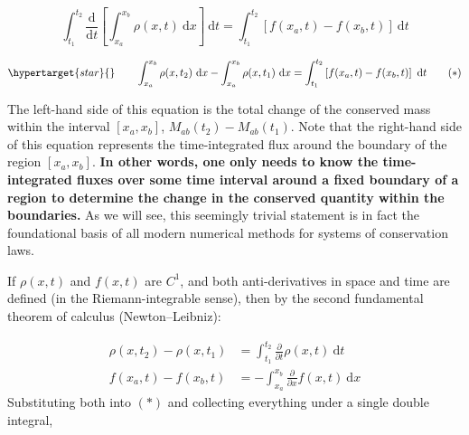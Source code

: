 \documentclass[notoc]{tufte-handout}
\begin{document}
\begin{equation}
\int_{t_1}^{t_2} \frac{\mathrm{d}}{\mathrm{d}t } \left[ \int_{x_a}^{x_b} \rho ({x},t)~\mathrm{d}x \right] ~\mathrm{d}t  = \int_{t_1}^{t_2} \left[ f(x_a,t) - f(x_b,t) \right]~\mathrm{d}t
\end {equation}

\begin {equation}
\hypertarget{star}{}\qquad \int_{x_a}^{x_b} \rho (x,t_2)~\mathrm{d}x - \int_{x_a}^{x_b} \rho (x,t_1)~\mathrm{d}x  =  \int_{t_1}^{t_2} \left[ f(x_a,t) - f(x_b,t) \right]~\mathrm{d}t \qquad (*)
\label{eqn:integral_form}
\end {equation}


The left-hand side of this equation is the total change of the conserved mass within the interval  $[x_a,x_b]$, $M_{ab}(t_2) - M_{ab}(t_1)$. Note that the right-hand side of this equation represents the time-integrated flux around the boundary of the region  $[x_a,x_b]$. {\bf In other words,  one only needs to know the time-integrated fluxes over some time interval around a fixed boundary of a region to determine the change in the conserved quantity within the boundaries.}  As we will see, this seemingly trivial statement is in fact the foundational basis of all modern numerical methods for systems of conservation laws.

If $\rho (x, t)$ and $f (x, t)$ are $C^1$, and both anti-derivatives in space and time are defined (in the Riemann-integrable sense), then by the second fundamental  theorem of calculus (Newton--Leibniz):

\begin{align}
\rho(x,t_2) - \rho(x,t_1) & = \int_{t_1}^{t_2} \frac{\partial}{\partial t}\rho(x,t)~\mathrm{d}t \\
f(x_a,t) - f(x_b,t) & = -\int_{x_a}^{x_b}\frac{\partial}{\partial x}f(x,t)~\mathrm{d}x
\end{align}
%
Substituting both into $(*)$ and collecting everything under a single double integral,
\end{document}
